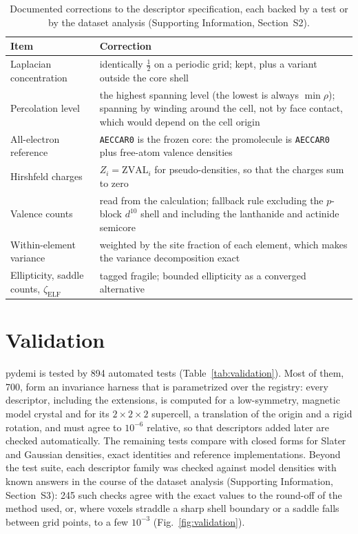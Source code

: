 \documentclass[11pt,a4paper]{article}
\begin{document}
\begin{table}[htbp]
\centering
\caption{Documented corrections to the descriptor specification, each backed by
a test or by the dataset analysis (Supporting Information, Section~S2).}
\label{tab:corrections}
\small
\begin{tabular}{p{4.2cm}p{10.3cm}}
\toprule
Item & Correction \\
\midrule
Laplacian concentration & identically $\tfrac12$ on a periodic grid; kept, plus a variant outside the core shell \\
Percolation level & the highest spanning level (the lowest is always $\min\rho$); spanning by winding around the cell, not by face contact, which would depend on the cell origin \\
All-electron reference & \texttt{AECCAR0} is the frozen core: the promolecule is \texttt{AECCAR0} plus free-atom valence densities \\
Hirshfeld charges & $Z_i=\mathrm{ZVAL}_i$ for pseudo-densities, so that the charges sum to zero \\
Valence counts & read from the calculation; fallback rule excluding the $p$-block $d^{10}$ shell and including the lanthanide and actinide semicore \\
Within-element variance & weighted by the site fraction of each element, which makes the variance decomposition exact \\
Ellipticity, saddle counts, $\zeta_{\mathrm{ELF}}$ & tagged fragile; bounded ellipticity as a converged alternative \\
\bottomrule
\end{tabular}
\end{table}

\section{Validation}
\label{sec:validation}

pydemi is tested by 894 automated tests (Table~\ref{tab:validation}). Most of
them, 700, form an invariance harness that is parametrized over the registry:
every descriptor, including the extensions, is computed for a low-symmetry,
magnetic model crystal and for its $2\times2\times2$ supercell, a translation of
the origin and a rigid rotation, and must agree to $10^{-6}$ relative, so that
descriptors added later are checked automatically. The remaining tests compare
with closed forms for Slater and Gaussian densities, exact identities and
reference implementations. Beyond the test suite, each descriptor family was
checked against model densities with known answers in the course of the
dataset analysis (Supporting Information, Section~S3): 245 such checks agree
with the exact values to the round-off of the method used, or, where voxels
straddle a sharp shell boundary or a saddle falls between grid points, to a few
$10^{-3}$ (Fig.~\ref{fig:validation}).
\end{document}
